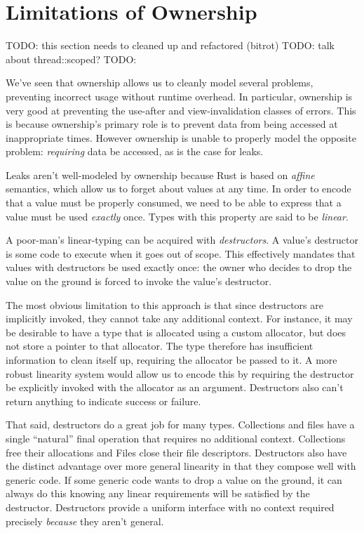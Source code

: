 \chapter{Limitations of Ownership}
\label{ch:limits}

TODO: this section needs to cleaned up and refactored (bitrot)
TODO: talk about thread::scoped?
TODO:

We've seen that ownership allows us to cleanly model several
problems, preventing incorrect usage without runtime overhead. In particular,
ownership is very good at preventing the use-after and view-invalidation
classes of errors. This is because ownership's primary role is to prevent data
from being accessed at inappropriate times. However ownership is unable to
properly model the opposite problem: \emph{requiring} data be accessed, as is the
case for leaks.

Leaks aren't well-modeled by ownership because Rust is based on \emph{affine}
semantics, which allow us to forget about values at any time.
In order to encode that a value must be properly consumed, we need to be able
to express that a value must be used \emph{exactly} once. Types with this property
are said to be \emph{linear}.

A poor-man's linear-typing can be acquired with \emph{destructors}. A value's destructor
is some code to execute when it goes out of scope. This effectively mandates that
values with destructors be used exactly once: the owner who decides to drop the
value on the ground is forced to invoke the value's destructor.

The most obvious limitation to this approach is that since destructors are implicitly invoked,
they cannot take any additional context. For instance, it may be desirable
to have a type that is allocated using a custom allocator, but does not store
a pointer to that allocator. The type therefore has insufficient information
to clean itself up, requiring the allocator be passed to it. A more robust linearity
system would allow us to encode this by requiring the destructor be explicitly invoked with
the allocator as an argument. Destructors also can't return anything to indicate
success or failure.

That said, destructors do a great job for many types. Collections and files
have a single ``natural'' final operation that requires no additional context.
Collections free their allocations and Files close their file descriptors.
Destructors also have the distinct advantage over more general linearity in that
they compose well with generic code. If some generic code wants to drop a value
on the ground, it can always do this knowing any linear requirements will be
satisfied by the destructor. Destructors provide a uniform interface with no
context required precisely \emph{because} they aren't general.

